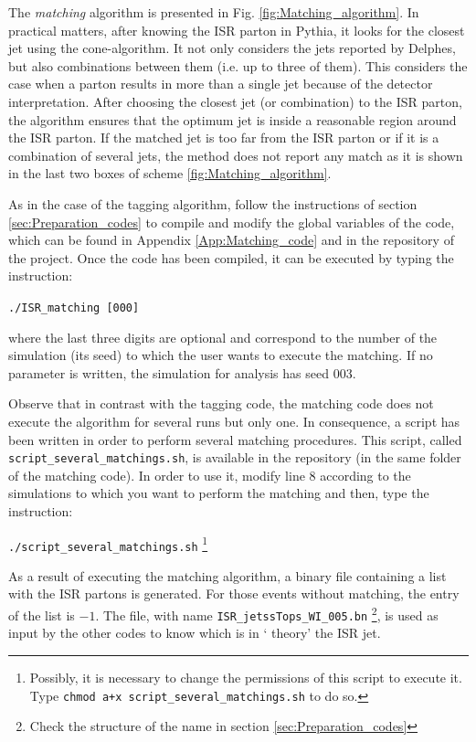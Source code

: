\documentclass[12pt, oneside]{book}              %
\begin{document}
The \textit{matching} algorithm is presented in Fig. \ref{fig:Matching_algorithm}.
In practical matters, after knowing the ISR parton in Pythia, it looks for the
closest jet using the cone-algorithm. It not only considers the jets reported
by Delphes, but also combinations between them (i.e. up to three of them). This
considers the case when a parton results in more than a single jet because of 
the detector interpretation. After choosing the closest jet (or combination) to
the ISR parton, the algorithm ensures that the optimum jet is inside a reasonable
region around the ISR parton. If the matched jet is too far from the ISR parton
or if it is a combination of several jets, the method does not report any 
match as it is shown in the last two boxes of scheme \ref{fig:Matching_algorithm}.

As in the case of the tagging algorithm, follow the instructions of section
\ref{sec:Preparation_codes} to compile and modify the global variables of
the code, which can be found in Appendix \ref{App:Matching_code} and in the
repository of the project. Once the code has been compiled, it can be executed
by typing the instruction:

\texttt{./ISR\_matching [000]}

where the last three digits are optional and correspond to the number of the
simulation (its seed) to which the user wants to execute the matching. If no
parameter is written, the simulation for analysis has seed 003.

Observe that in contrast with the tagging code, the matching code does not 
execute the algorithm for several runs but only one. In consequence, a script 
has been  written in order to perform several matching procedures. This script,
called \texttt{script\_several\_matchings.sh}, is available in the repository
(in the same folder of the matching code). In order to use it, modify line 8 
according to the simulations to which you want to perform the matching and then,
type the instruction:

\texttt{./script\_several\_matchings.sh} \footnote{Possibly, it is necessary
	to change the permissions of this script to execute it. Type \texttt{chmod
		a+x script\_several\_matchings.sh} to do so.}

As a result of executing the matching algorithm, a binary file containing a
list with the ISR partons is generated. For those events without matching,
the entry of the list is $ -1 $. The file, with name \texttt{ISR\_jetssTops\_WI\_005.bn}
\footnote{Check the structure of the name in section \ref{sec:Preparation_codes}},
is used as input by the other codes to know which is in \textquoteleft 
theory' the ISR jet.
\end{document}
